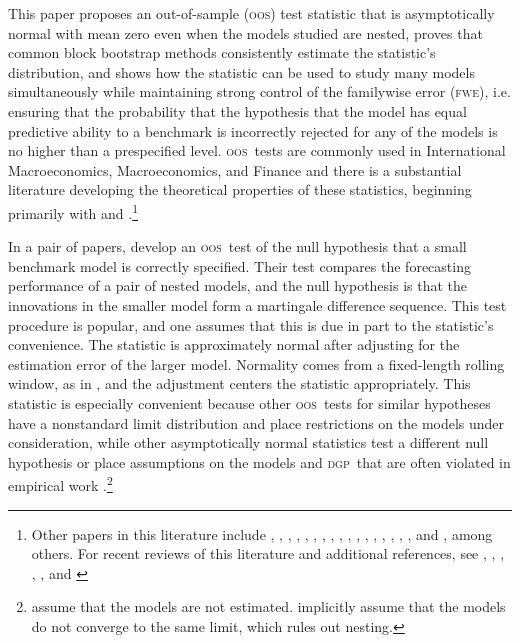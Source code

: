 \documentclass[12pt,fleqn]{article}
\theoremstyle{definition}
\newcommand{\dgp}{\textsc{dgp}}
\newcommand{\fwe}{\textsc{fwe}}
\newcommand{\oos}{\textsc{oos}}
\begin{document}
\newpage \noindent This paper proposes an out-of-sample (\oos) test
statistic that is asymptotically normal with mean zero even when the
models studied are nested, proves that common block bootstrap methods
consistently estimate the statistic's distribution, and shows how the
statistic can be used to study many models simultaneously while
maintaining strong control of the familywise error (\fwe),
i.e. ensuring that the probability that the hypothesis that the model
has equal predictive ability to a benchmark is incorrectly rejected
for any of the models is no higher than a prespecified level.  \oos\
tests are commonly used in International Macroeconomics,
Macroeconomics, and Finance \citep[see, for
example,][]{MeR:83,StW:03,GoW:08} and there is a substantial
literature developing the theoretical properties of these statistics,
beginning primarily with \citet{DiM:95} and
\citet{Wes:96}.\footnote{Other papers in this literature include
  \citet{WeM:98}, \citet{Mcc:98,Mcc:00},
  \citet{ClM:01,ClM:05-2,ClM:05,ClM:09b,ClM:11b,ClM:11},
  \citet{CCS:01}, \citet{CoS:02,CoS:04,CoS:07}, \citet{Whi:00},
  \citet{InK:04,InK:06}, \citet{Han:05}, \citet{Ros:05},
  \citet{ClW:06,ClW:07}, \citet{Ana:07}, \citet{GiR:09,GiR:10},
  \citet{HuW:10}, \citet{HLN:11}, \cite{InR:11}, \cite{Pin:11},
  \cite{RoS:11,RoS:11b}, and \citet{Cal:11}, among others.  For recent
  reviews of this literature and additional references, see
  \citet{McW:02}, \citet{CoS:06}, \citet{Wes:06}, \citet{ClM:11c},
  \citet{CoD:11}, and \citet{Gia:11}}

In a pair of papers, \citet{ClW:06,ClW:07} develop an \oos\ test of
the null hypothesis that a small benchmark model is correctly
specified.  Their test compares the forecasting performance of a pair
of nested models, and the null hypothesis is that the innovations in
the smaller model form a martingale difference sequence.  This test
procedure is popular, and one assumes that this is due in part to the
statistic's convenience.  The statistic is approximately normal after
adjusting for the estimation error of the larger model.  Normality
comes from a fixed-length rolling window, as in \citet{GiW:06}, and
the adjustment centers the statistic appropriately.  This statistic is
especially convenient because other \oos\ tests for similar hypotheses
\citep[among others]{Mcc:07,ClM:05,ClM:01,CoS:04,CoS:02,CCS:01} have a
nonstandard limit distribution and place restrictions on the models
under consideration, while other asymptotically normal statistics test
a different null hypothesis \citep{GiW:06} or place assumptions on the
models and \dgp\ that are often violated in empirical work
\citep{Wes:96,WeM:98,Mcc:00,DiM:95}.\footnote{\citet{DiM:95} assume
  that the models are not estimated. \citet{Wes:96,WeM:98,Mcc:00}
  implicitly assume that the models do not converge to the same limit,
  which rules out nesting.}
\end{document}
